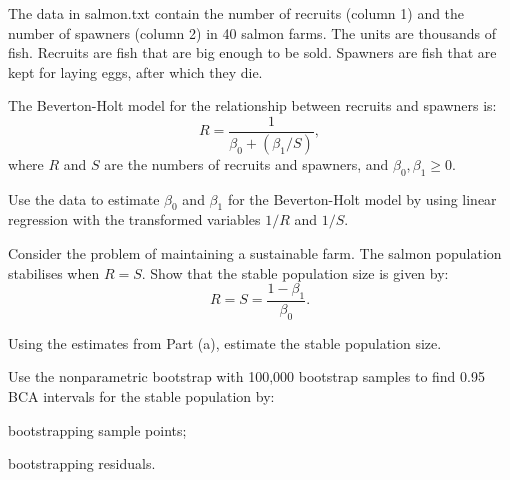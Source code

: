 \begin{exercise}
The data in salmon.txt contain the number of recruits (column 1) and the number of spawners (column 2) in 40 salmon farms. The units are thousands of fish. Recruits are fish that are big enough to be sold. Spawners are fish that are kept for laying eggs, after which they die.

The Beverton-Holt model for the relationship between recruits and spawners is:
$$R=\frac{1}{\beta_0+(\beta_1/S)},$$
where $R$ and $S$ are the numbers of recruits and spawners, and $\beta_0,\beta_1\geq 0$.
\begin{asparaenum}[(a)]
\item	Use the data to estimate $\beta_0$ and $\beta_1$ for the Beverton-Holt model by using linear regression with the transformed variables $1/R$ and $1/S$.

\item	Consider the problem of maintaining a sustainable farm. The salmon population stabilises when $R = S$. Show that the stable population size is given by:
$$R=S=\frac{1-\beta_1}{\beta_0}.$$

Using the estimates from Part (a), estimate the stable population size.

\item	Use the nonparametric bootstrap with 100,000 bootstrap samples to find 0.95 BCA intervals for the stable population by:
\begin{asparaenum}[(i)]
\item	bootstrapping sample points;

\item	bootstrapping residuals.
\end{asparaenum}\end{asparaenum}
\end{exercise}

